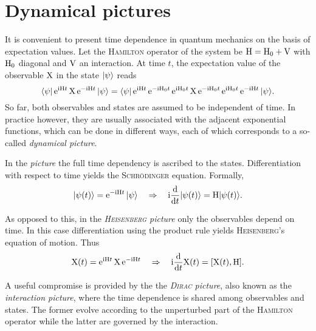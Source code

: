 \section{Dynamical pictures}

It is convenient to present time dependence in quantum mechanics on the basis of
expectation values. Let the \textsc{Hamilton} operator of the system be $\mathrm H =
\mathrm H_0 + \mathrm V$ with $\mathrm H_0$ diagonal and $\mathrm V$ an interaction. At time
$t$, the expectation value of the observable $\mathrm X$ in the state $|\psi\rangle$
reads
%
\begin{equation*}
    \langle\psi| \, \mathrm e^{\mathrm i \mathrm H t} \, \mathrm X \, \mathrm e^{-\mathrm i \mathrm H t} \, |\psi\rangle =
    \langle\psi| \, \mathrm e^{\mathrm i \mathrm H t} \, \mathrm e^{-\mathrm i \mathrm H_0 t} \,
    \mathrm e^{\mathrm i \mathrm H_0 t} \, \mathrm X \, \mathrm e^{-\mathrm i \mathrm H_0 t} \,
    \mathrm e^{\mathrm i \mathrm H_0 t} \, \mathrm e^{-\mathrm i \mathrm H t} \, |\psi\rangle.
\end{equation*}
%
So far, both observables and states are assumed to be independent of time. In
practice however, they are usually associated with the adjacent exponential
functions, which can be done in different ways, each of which corresponds to a
so-called \emph{dynamical picture}.

In the \emph{ picture} the full time dependency is ascribed to
the states. Differentiation with respect to time yields the \textsc{Schrödinger}
equation. Formally,
%
\begin{equation*}
    |\psi(t)\rangle = \mathrm e^{-\mathrm i \mathrm H t} \, |\psi\rangle
    \quad \Rightarrow \quad
    \mathrm i \frac {\mathrm d} {\mathrm d t} |\psi(t)\rangle = \mathrm H |\psi(t)\rangle.
\end{equation*}

As opposed to this, in the \emph{\textsc{Heisenberg} picture} only the
observables depend on time. In this case differentiation using the product rule
yields \textsc{Heisenberg}'s equation of motion. Thus
%
\begin{equation*}
    \mathrm X(t) = \mathrm e^{\mathrm i \mathrm H t} \, \mathrm X \, \mathrm e^{-\mathrm i \mathrm H t}
    \quad \Rightarrow \quad
    \mathrm i \frac {\mathrm d} {\mathrm d t} \mathrm X(t) = [\mathrm X(t), \mathrm H].
\end{equation*}

A useful compromise is provided by the the \emph{\textsc{Dirac} picture}, also
known as the \emph{interaction picture}, where the time dependence is shared
among observables and states. The former evolve according to the unperturbed
part of the \textsc{Hamilton} operator while the latter are governed by the
interaction.

